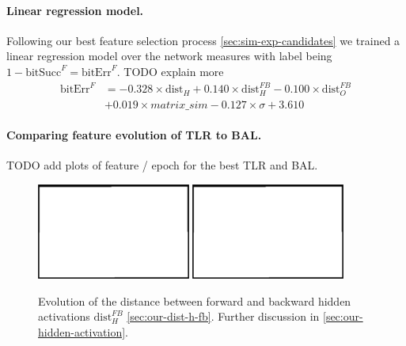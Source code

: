\paragraph{Linear regression model.} 

Following our best feature selection process \ref{sec:sim-exp-candidates} we trained a linear regression model over the network measures with label being $1-\mbox{bitSucc}^F = \mbox{bitErr}^F$. TODO explain more 
\begin{align} 
\label{eq:results-candidates-linear-regression} 
\mbox{bitErr}^F &= 
- 0.328 \times \mbox{dist}_{H}
+ 0.140 \times \mbox{dist}_{H}^{FB}
- 0.100 \times \mbox{dist}_{O}^{FB} \nonumber \\
&+ 0.019 \times matrix\_sim
- 0.127 \times \sigma
+ 3.610
\end{align} 

\paragraph{Comparing feature evolution of TLR to BAL.} 

TODO add plots of feature / epoch for the best TLR and BAL. 

\begin{figure}[H]
  \centering
  \includegraphics[width=0.45\textwidth]{img/placeholder.png}  %
  \includegraphics[width=0.45\textwidth]{img/placeholder.png}  %
  \caption{Evolution of the distance between forward and backward hidden activations $\mbox{dist}_{H}^{FB}$ \ref{sec:our-dist-h-fb}. Further discussion in \ref{sec:our-hidden-activation}. }
  \label{fig:results-candidates-dist-h-fb}
\end{figure}

